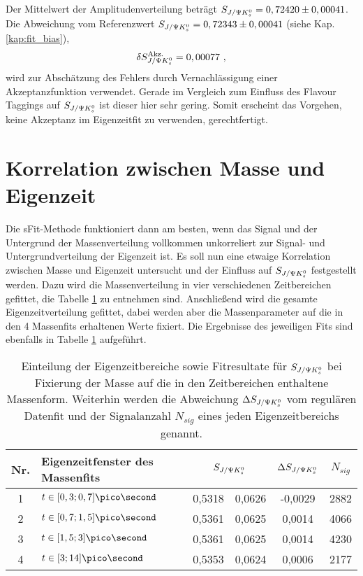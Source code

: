 Der Mittelwert der Amplitudenverteilung beträgt $S_{J/\Psi K_s^0} = 0,72420 \pm 0,00041$. Die Abweichung vom Referenzwert $S_{J/\Psi K_s^0} = 0,72343 \pm 0,00041$ (siehe Kap. \ref{kap:fit_bias}),
\begin{align}
\delta S_{J/\Psi K_s^0}^{\text{Akz.}} = 0,00077\ ,
\end{align}
wird zur Abschätzung des Fehlers durch Vernachlässigung einer Akzeptanzfunktion verwendet. Gerade im Vergleich zum Einfluss des Flavour Taggings auf $S_{J/\Psi K_s^0}$ ist dieser hier sehr gering. Somit erscheint das Vorgehen, keine Akzeptanz im Eigenzeitfit zu verwenden, gerechtfertigt.


\section{Korrelation zwischen Masse und Eigenzeit}
Die sFit-Methode funktioniert dann am besten, wenn das Signal und der Untergrund der Massenverteilung vollkommen unkorreliert zur Signal- und Untergrundverteilung der Eigenzeit ist. Es soll nun eine etwaige Korrelation zwischen Masse und Eigenzeit untersucht und der Einfluss auf $S_{J/\Psi K_s^0}$ festgestellt werden. Dazu wird die Massenverteilung in vier verschiedenen Zeitbereichen gefittet, die Tabelle \ref{tab:mass_ct} zu entnehmen sind. Anschließend wird die gesamte Eigenzeitverteilung gefittet, dabei werden aber die Massenparameter auf die in den 4 Massenfits erhaltenen Werte fixiert. Die Ergebnisse des jeweiligen Fits sind ebenfalls in Tabelle \ref{tab:mass_ct} aufgeführt.
\begin{table}[hptb]
\centering
\caption{Einteilung der Eigenzeitbereiche sowie Fitresultate für $S_{J/\Psi K_s^0}$ bei Fixierung der Masse auf die in den Zeitbereichen enthaltene Massenform. Weiterhin werden die Abweichung $\Delta S_{J/\Psi K_s^0}$ vom regulären Datenfit und der Signalanzahl $N_{sig}$ eines jeden Eigenzeitbereichs genannt.}
\label{tab:mass_ct}
\begin{tabular}{c l r@{$\pm$}l c c}
\hline \hline
Nr. & Eigenzeitfenster des Massenfits & \multicolumn{2}{c}{$S_{J/\Psi K_s^0}$} & $\Delta S_{J/\Psi K_s^0}$ & $N_{sig}$\\ \hline
1 & $t \in [0,3; 0,7] \pico\second$ & 0,5318 & 0,0626 & -0,0029 & 2882 \\
2 & $t \in [0,7; 1,5] \pico\second$ & 0,5361 & 0,0625 & 0,0014 & 4066 \\
3 & $t \in [1,5; 3] \pico\second$ & 0,5361 & 0,0625 & 0,0014 & 4230 \\
4 & $t \in [3; 14] \pico\second$ & 0,5353 & 0,0624 & 0,0006 & 2177 \\ \hline \hline
\end{tabular}
\end{table}

